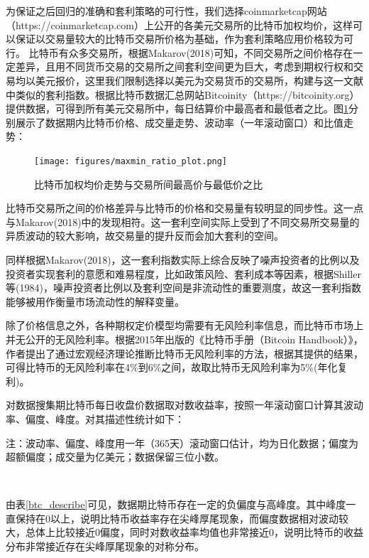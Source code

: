 \par{为保证之后回归的准确和套利策略的可行性，我们选择coinmarketcap网站（https://coinmarketcap.com）上公开的各美元交易所的比特币加权均价，这样可以保证以交易量较大的比特币交易所价格为基础，作为套利策略应用价格较为可行。
比特币有众多交易所，根据Makarov(2018)可知，不同交易所之间价格存在一定差异，且用不同货币交易的交易所之间套利空间更为巨大\cite{Makarov-2018}，考虑到期权行权和交易均以美元报价，这里我们限制选择以美元为交易货币的交易所，构建与这一文献中类似的套利指数。根据比特币数据汇总网站Bitcoinity（https://bitcoinity.org）提供数据，可得到所有美元交易所中，每日结算价中最高者和最低者之比。图\ref{maxmin_ratio}分别展示了数据期内比特币价格、成交量走势、波动率（一年滚动窗口）和比值走势：
\begin{figure}[H]
\begin{small}
    \begin{center}
        \texttt{[image: figures/maxmin\_ratio\_plot.png]} 
    \end{center}
    \caption{比特币加权均价走势与交易所间最高价与最低价之比}
    \label{maxmin_ratio}
\end{small}
\end{figure}
}
\par{比特币交易所之间的价格差异与比特币的价格和交易量有较明显的同步性。这一点与Makarov(2018)中的发现相符\cite{Makarov-2018}。这一套利空间实际上受到了不同交易所交易量的异质波动的较大影响，故交易量的提升反而会加大套利的空间。}
\par{同样根据Makarov(2018)，这一套利指数实际上综合反映了噪声投资者的比例以及投资者实现套利的意愿和难易程度，比如政策风险、套利成本等因素，根据Shiller等(1984)，噪声投资者比例以及套利空间是非流动性的重要测度，故这一套利指数能够被用作衡量市场流动性的解释变量。}

\par{除了价格信息之外，各种期权定价模型均需要有无风险利率信息，而比特币市场上并无公开的无风险利率。根据2015年出版的《比特币手册（Bitcoin Handbook）》\cite{WESNER2015223}，作者提出了通过宏观经济理论推断比特币无风险利率的方法，根据其提供的结果，可得比特币的无风险利率在4$\%$到6$\%$之间，故取比特币无风险利率为5$\%$(年化复利)。
}


\par{
对数据搜集期比特币每日收盘价数据取对数收益率，按照一年滚动窗口计算其波动率、偏度、峰度。对其描述性统计如下：}
\begin{center}
\begin{threeparttable}[H]
    
    \centering
    \caption{比特币数据描述性统计}
    \label{btc_describe}
    
    \begin{tablenotes}
        \footnotesize
        \item 注：波动率、偏度、峰度用一年（365天）滚动窗口估计，均为日化数据；偏度为超额偏度；成交量为亿美元；数据保留三位小数。
    \end{tablenotes}
\end{threeparttable}
\end{center}

~\\
\par{

由表\ref{btc_describe}可见，数据期比特币存在一定的负偏度与高峰度。其中峰度一直保持在0以上，说明比特币收益率存在尖峰厚尾现象，而偏度数据相对波动较大，总体上比较接近0偏度，同时对数收益率均值也非常接近0，说明比特币的收益分布非常接近存在尖峰厚尾现象的对称分布。
}
